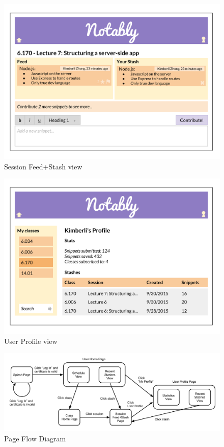 \documentclass{article}
\begin{document}
\begin{figure}[h!]
  \caption{Session Feed+Stash view}
  \centering
    \includegraphics[width=6in]{UI1.png}
\end{figure}

\begin{figure}[h!]
  \caption{User Profile view}
  \centering
    \includegraphics[width=6in]{UI5.png}
\end{figure}

\begin{figure}[h!]
  \caption{Page Flow Diagram}
  \centering
    \includegraphics[width=6in]{PageFlowDiagram.png}
\end{figure}
\end{document}
